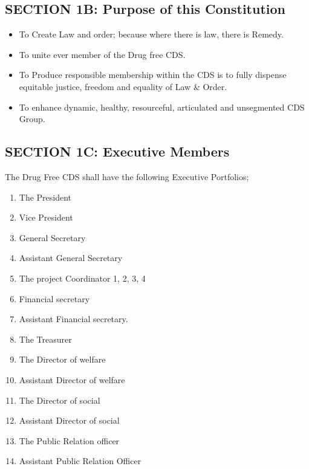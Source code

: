 \documentclass{report}
\begin{document}
\subsection{SECTION 1B: Purpose of this Constitution}
\begin{itemize}
    \item To Create Law and order; because where there is law, there is Remedy. 
    
    \item To unite ever member of the Drug free CDS.
     
    \item To Produce responsible membership within the CDS is to fully dispense equitable justice, freedom and equality of Law & Order.
    
    \item To enhance dynamic, healthy, resourceful, articulated and unsegmented CDS Group. 
\end{itemize}


\subsection{SECTION 1C: Executive Members}
The Drug Free CDS shall have the following Executive Portfolios;
\begin{enumerate}
    \item The President 
    \item Vice President
    \item General Secretary
    \item Assistant General Secretary
    \item The project Coordinator 1, 2, 3, 4
    \item Financial secretary 
    \item Assistant Financial secretary.
    \item The Treasurer
    \item The Director of welfare
    \item Assistant Director of welfare
    \item The Director of social 
    \item Assistant Director of social 
    \item The Public Relation officer
    \item Assistant Public Relation Officer
\end{enumerate}
\end{document}
